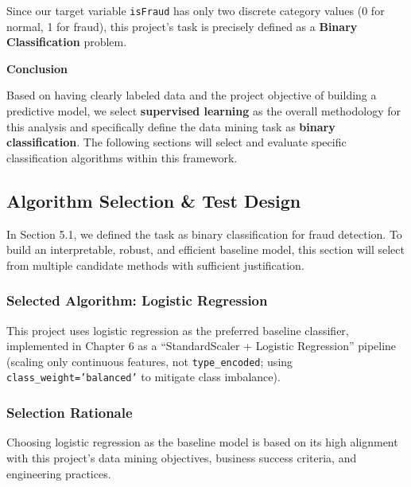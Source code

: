 \documentclass[sigplan,screen]{acmart}
\begin{document}
Since our target variable \texttt{isFraud} has only two discrete category values (0 for normal, 1 for fraud), this project's task is precisely defined as a \textbf{Binary Classification} problem.

\textbf{Conclusion}

Based on having clearly labeled data and the project objective of building a predictive model, we select \textbf{supervised learning} as the overall methodology for this analysis and specifically define the data mining task as \textbf{binary classification}. The following sections will select and evaluate specific classification algorithms within this framework.

\subsection{Algorithm Selection \& Test Design}

In Section 5.1, we defined the task as binary classification for fraud detection. To build an interpretable, robust, and efficient baseline model, this section will select from multiple candidate methods with sufficient justification.

\subsubsection{Selected Algorithm: Logistic Regression}

This project uses logistic regression as the preferred baseline classifier, implemented in Chapter 6 as a ``StandardScaler + Logistic Regression'' pipeline (scaling only continuous features, not \texttt{type\_encoded}; using \texttt{class\_weight='balanced'} to mitigate class imbalance).

\subsubsection{Selection Rationale}

Choosing logistic regression as the baseline model is based on its high alignment with this project's data mining objectives, business success criteria, and engineering practices.
\end{document}
